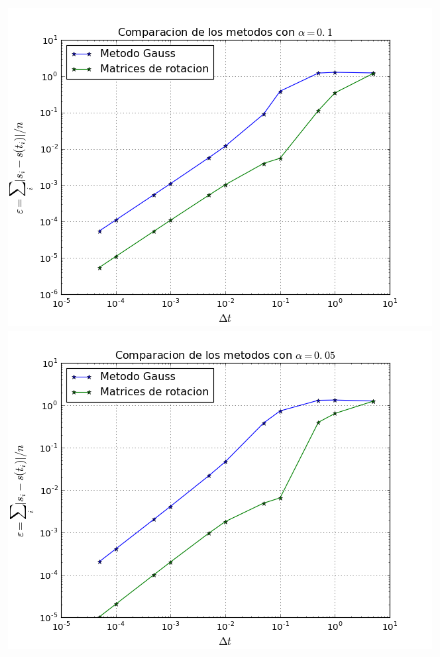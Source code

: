 \documentclass[a4paper, 11pt, spanish]{article}
\begin{document}
\begin{figure}[!ht]
\includegraphics[scale=0.4]{img/comparacio_metodos_1e-1.png}
\includegraphics[scale=0.4]{img/comparacion_metodos_5e-2.png}%
\end{figure}
\end{document}
